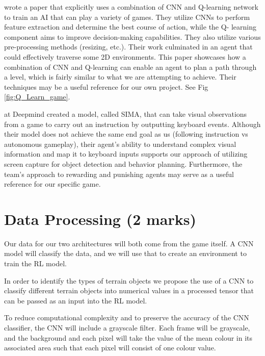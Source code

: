\documentclass{article} %
\begin{document}
\cite{General+Video+Game+AI:+Learning+from+Screen+Capture} wrote a paper that explicitly uses a combination of CNN and Q-learning network to 
train an AI that can play a variety of games. They utilize CNNs to perform 
feature extraction and determine the best course of action, while the Q-
learning component aims to improve decision-making capabilities. They also 
utilize various pre-processing methods (resizing, etc.). Their work 
culminated in an agent that could effectively traverse some 2D environments. This paper showcases how a combination of CNN and Q-learning can enable an 
agent to plan a path through a level, which is fairly similar to what we are 
attempting to achieve. Their techniques may be a useful reference for our own 
project. See Fig \ref{fig:Q_Learn_game}.

\cite{DeepMind+Sima} at Deepmind created a model, called SIMA, 
that can take visual observations from a game to carry out an 
instruction by outputting keyboard events. Although their model does not achieve the same end goal as us (following instruction vs autonomous gameplay), their agent’s ability to understand complex visual information and map it to keyboard inputs supports our approach of utilizing screen capture for object detection and behavior planning. Furthermore, the team’s approach to rewarding and punishing agents may serve as a useful reference for our specific game.

\section{Data Processing (2 marks)}

Our data for our two architectures will both come from the game itself. A CNN 
model will classify the data, and we will use that to create an environment to 
train the RL model. 

In order to identify the types of terrain objects we propose the use of a CNN 
to classify different terrain objects into numerical values in a processed 
tensor that can be passed as an input into the RL model. 

To reduce computational complexity and to preserve the accuracy of the CNN 
classifier, the CNN will include a grayscale filter. Each frame will be grayscale, and the background and each pixel 
will take the value of the mean colour in its associated area such that each 
pixel will consist of one colour value. 
\end{document}
